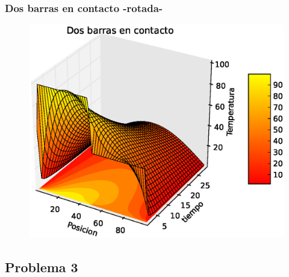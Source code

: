 \documentclass[12pt]{beamer}
\begin{document}
\begin{frame}
\frametitle{Dos barras en contacto -rotada-}
\begin{figure}
	\centering
	\includegraphics[scale=0.5]{Imagenes/EqCalor07.eps}  
\end{figure}
\end{frame}

\subsection{Problema 3}
\end{document}
